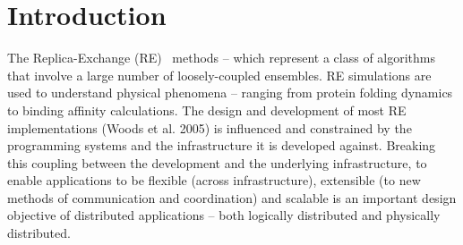 \documentclass{rspublic}
\newcommand{\alnote}[1]{ {\textcolor{blue} { ***andre: #1 }}}
\newcommand{\alnote}[1]{}
\begin{document}
\begin{abstract}{Replica-Exchange, SAGA, Large-Scale, Production}

\end{abstract}

\section{Introduction}

The Replica-Exchange (RE)~\citep{hansmann,Sugita:1999rm} methods --
which represent a class of algorithms that involve a large number of
loosely-coupled ensembles.  RE simulations are used to understand
physical phenomena -- ranging from protein folding dynamics to binding
affinity calculations.  The design and development of most RE
implementations (Woods et al. 2005) is influenced and constrained by
the programming systems and the infrastructure it is developed
against.  Breaking this coupling between the development and the
underlying infrastructure, to enable applications to be flexible
(across infrastructure), extensible (to new methods of communication
and coordination) and scalable is an important design objective of
distributed applications -- both logically distributed and physically
distributed.
\end{document}
